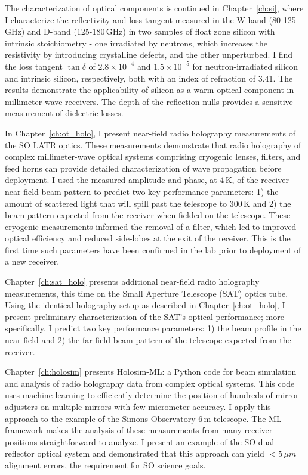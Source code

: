 The characterization of optical components is continued in Chapter~\ref{ch:si}, where I characterize the reflectivity and loss tangent measured in the W-band (80-125\,GHz) and D-band (125-180\,GHz) in two samples of float zone silicon with intrinsic stoichiometry - one irradiated by neutrons, which increases the resistivity by introducing crystalline defects, and the other unperturbed.  I find the loss tangent $\tan\delta$ of $2.8\times10^{-4}$ and $1.5\times10^{-5}$ for neutron-irradiated silicon and intrinsic silicon, respectively, both with an index of refraction of 3.41.  The results demonstrate the applicability of silicon as a warm optical component in millimeter-wave receivers.  The depth of the reflection nulls provides a sensitive measurement of dielectric losses.

In Chapter~\ref{ch:ot_holo}, I present near-field radio holography measurements of the SO LATR optics.  These measurements demonstrate that radio holography of complex millimeter-wave optical systems comprising cryogenic lenses, filters, and feed horns can provide detailed characterization of wave propagation before deployment.  I used the measured amplitude and phase, at 4\,K, of the receiver near-field beam pattern to predict two key performance parameters: 1) the amount of scattered light that will spill past the telescope to 300\,K and 2) the beam pattern expected from the receiver when fielded on the telescope.  These cryogenic measurements informed the removal of a filter, which led to improved optical efficiency and reduced side-lobes at the exit of the receiver.  This is the first time such parameters have been confirmed in the lab prior to deployment of a new receiver.

Chapter~\ref{ch:sat_holo} presents additional near-field radio holography measurements, this time on the Small Aperture Telescope (SAT) optics tube.  Using the identical holography setup as described in Chapter~\ref{ch:ot_holo}, I present preliminary characterization of the SAT's optical performance; more specifically, I predict two key performance parameters: 1) the beam profile in the near-field and 2) the far-field beam pattern of the telescope expected from the receiver.

Chapter~\ref{ch:holosim} presents Holosim-ML: a Python code for beam simulation and analysis of radio holography data from complex optical systems.  This code uses machine learning to efficiently determine the position of hundreds of mirror adjusters on multiple mirrors with few micrometer accuracy.  I apply this approach to the example of the Simons Observatory 6\,m telescope.  The ML framework makes the analysis of these measurements from many receiver positions straightforward to analyze.  I present an example of the SO dual reflector optical system and demonstrated that this approach can yield $<5\,\mu m$ alignment errors, the requirement for SO science goals.

